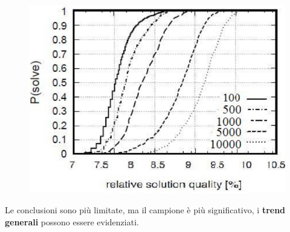 \documentclass{article}
\begin{document}
\begin{figure}[H]
    \centering
    \includegraphics[scale=0.45]{images/SQD_2.png}
\end{figure}

Le conclusioni sono più limitate, ma il campione è più significativo, i \textbf{trend generali} possono
essere evidenziati.
\end{document}
